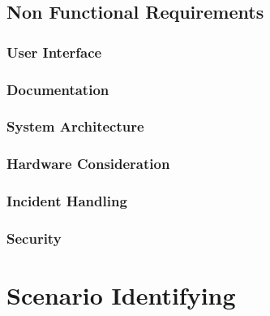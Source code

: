 \documentclass[a4paper]{article}
\begin{document}
\subsection{Non Functional Requirements}
\subsubsection{User Interface}
\subsubsection{Documentation}
\subsubsection{System Architecture}
\subsubsection{Hardware Consideration}
\subsubsection{Incident Handling}
\subsubsection{Security}

\section{Scenario Identifying}
\end{document}
